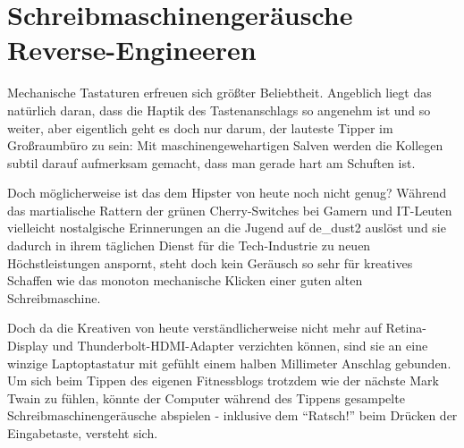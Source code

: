 \documentclass[a5paper,pagesize,10pt,bibtotoc,pointlessnumbers,normalheadings,DIV=9,twoside=false]{scrbook}
\begin{document}
\chapter{Schreibmaschinengeräusche Reverse-Engineeren}

Mechanische Tastaturen erfreuen sich größter Beliebtheit.
Angeblich liegt das natürlich daran, dass die Haptik des Tastenanschlags so angenehm ist und so weiter, aber eigentlich geht es doch nur darum, der lauteste Tipper im Großraumbüro zu sein:
Mit maschinengewehartigen Salven werden die Kollegen subtil darauf aufmerksam gemacht, dass man gerade hart am Schuften ist.

Doch möglicherweise ist das dem Hipster von heute noch nicht genug?
Während das martialische Rattern der grünen Cherry-Switches bei Gamern und IT-Leuten vielleicht nostalgische Erinnerungen an die Jugend auf de\_dust2 auslöst und sie dadurch in ihrem täglichen Dienst für die Tech-Industrie zu neuen Höchstleistungen anspornt, steht doch kein Geräusch so sehr für kreatives Schaffen wie das monoton mechanische Klicken einer guten alten Schreibmaschine.

Doch da die Kreativen von heute verständlicherweise nicht mehr auf Retina-Display und Thunderbolt-HDMI-Adapter verzichten können, sind sie an eine winzige Laptoptastatur mit gefühlt einem halben Millimeter Anschlag gebunden.
Um sich beim Tippen des eigenen Fitnessblogs trotzdem wie der nächste Mark Twain zu fühlen, könnte der Computer während des Tippens gesampelte Schreibmaschinengeräusche abspielen - inklusive dem ``Ratsch!'' beim Drücken der Eingabetaste, versteht sich.



\end{document}

